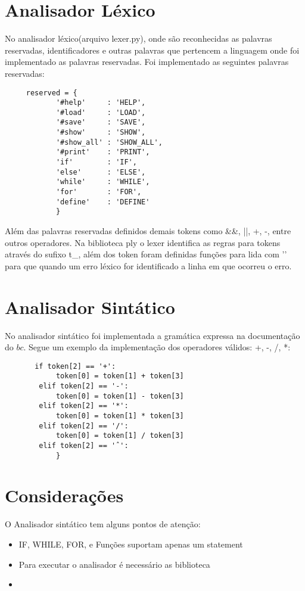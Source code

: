 \documentclass[12pt]{article}
\begin{document}
\section{Analisador Léxico}

No analisador léxico(arquivo lexer.py), onde são reconhecidas as palavras reservadas, identificadores e outras palavras que pertencem a linguagem onde foi implementado as palavras reservadas.
Foi implementado as seguintes palavras reservadas:

\begin{verbatim}
     reserved = {
            '#help'     : 'HELP',
            '#load'     : 'LOAD',
            '#save'     : 'SAVE',
            '#show'     : 'SHOW',
            '#show_all' : 'SHOW_ALL',
            '#print'    : 'PRINT',
            'if'        : 'IF',
            'else'      : 'ELSE',
            'while'     : 'WHILE',
            'for'       : 'FOR',
            'define'    : 'DEFINE'
            }
\end{verbatim}

Além das palavras reservadas definidos demais tokens como \&\&, ||, +, -, entre outros operadores. Na biblioteca ply o lexer identifica as regras para tokens através do sufixo t\_, além dos token foram definidas funções para lida com '\n' para que quando um erro léxico for identificado a linha em que ocorreu o erro.


\section{Analisador Sintático}

No analisador sintático foi implementada a gramática expressa na documentação do $bc$.
Segue um exemplo da implementação dos operadores válidos: +, -, /, *: 

\begin{verbatim}
       if token[2] == '+':
            token[0] = token[1] + token[3]
        elif token[2] == '-':
            token[0] = token[1] - token[3]
        elif token[2] == '*':
            token[0] = token[1] * token[3]
        elif token[2] == '/':
            token[0] = token[1] / token[3]
        elif token[2] == 'ˆ':
            }
\end{verbatim}


\section{Considerações}

 O Analisador sintático tem alguns pontos de atenção:
 \begin{itemize}
     \item IF, WHILE, FOR, e Funções suportam apenas um statement
     \item Para executar o analisador é necessário as biblioteca
     \item
 \end{itemize}
   
\end{document}
